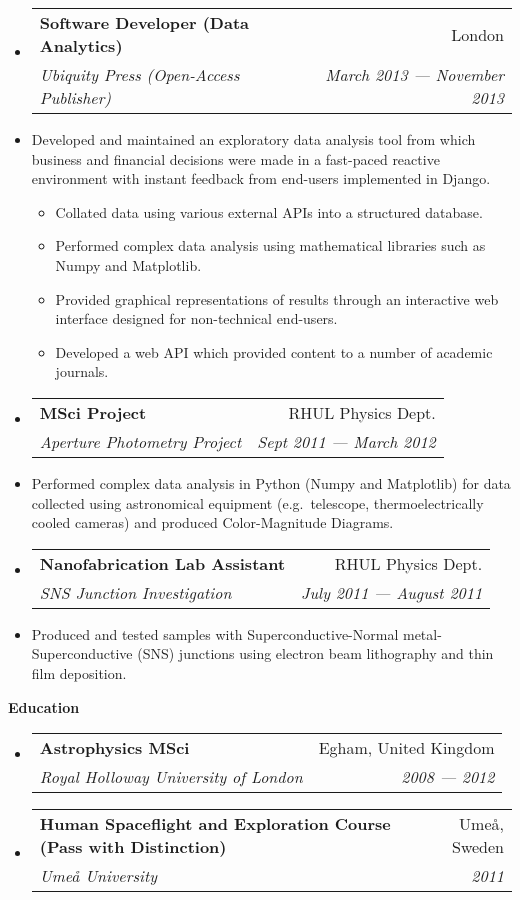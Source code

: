 \documentclass[letterpaper,11pt]{article}
\makeatletter
\newcommand{\resitem}[1]{\item #1 \vspace{-2pt}}
\newcommand{\resheading}[1]{{\large \colorbox{mygrey}
            {\begin{minipage}{\textwidth}
                {\textbf{#1 \vphantom{p\^{E}}}}
            \end{minipage}}}
    }
\newcommand{\ressubheading}[4]{
        \begin{tabular*}{180mm}{l@{\extracolsep{\fill}}r}
            \textbf{#1} & #2 \\
            \textit{#3} & \textit{#4} \\
        \end{tabular*}\vspace{-6pt}
    }
\newcommand{\resdescription}[1]{#1 \vspace{-0mm}}
\makeatother
\begin{document}
\begin{itemize}
        \item[]
            \ressubheading{Software Developer (Data Analytics)}{London}{Ubiquity Press (Open-Access Publisher)}{March 2013 --- November 2013}
        \item[]
            \resdescription{Developed and maintained an exploratory data analysis tool from which business and financial decisions were made in a fast-paced reactive environment with instant feedback from end-users implemented in Django. }
            \begin{itemize}
                    \resitem{Collated data using various external APIs into a structured database.}
                    \resitem{Performed complex data analysis using mathematical libraries such as Numpy and Matplotlib.}
                    \resitem{Provided graphical representations of results through an interactive web interface designed for non-technical end-users.}
                    \resitem{Developed a web API which provided content to a number of academic journals.}
            \end{itemize}

        \item[]
            \ressubheading{MSci Project}{RHUL Physics Dept.}{Aperture Photometry Project}{Sept 2011 --- March 2012}
        \item[]
            \resdescription{Performed complex data analysis in Python (Numpy and Matplotlib) for data collected using astronomical equipment (e.g.\ telescope, thermoelectrically cooled cameras) and produced Color-Magnitude Diagrams.}

        \item[]
            \ressubheading{Nanofabrication Lab Assistant}{RHUL Physics Dept.}{SNS Junction Investigation}{July 2011 --- August 2011}
        \item[]
            \resdescription{Produced and tested samples with Superconductive-Normal metal-Superconductive (SNS) junctions using electron beam lithography and thin film deposition.}

    \end{itemize}

    \resheading{Education}
    \begin{itemize}
        \item[]
            \ressubheading{Astrophysics MSci }{Egham, United Kingdom}{Royal Holloway University of London}{2008 --- 2012}

        \item[]
            \ressubheading{Human Spaceflight and Exploration Course (Pass with Distinction)}{Ume\r{a}, Sweden}{Ume\r{a} University}{2011}

    \end{itemize}
\end{document}
